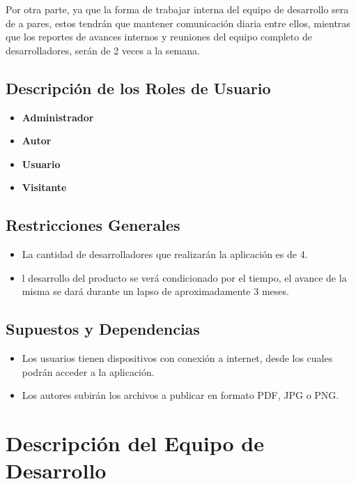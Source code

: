 \documentclass[a4paper,12 pt]{article}
\begin{document}
Por otra parte, ya que la forma de trabajar interna del equipo de desarrollo sera de a pares, estos tendrán que mantener comunicación diaria entre ellos, mientras que los reportes de avances internos y  reuniones del equipo completo de desarrolladores, serán de 2 veces a la semana.

\subsection{Descripción de los Roles de Usuario}

\begin{itemize}
    \item \textbf{Administrador} 
    \item \textbf{Autor} 
    \item \textbf{Usuario} 
    \item \textbf{Visitante} 
\end{itemize}{}

\subsection{Restricciones Generales}

\begin{itemize}
    \item La cantidad de desarrolladores que realizarán la aplicación es de 4.
    \item l desarrollo del producto se verá condicionado por el tiempo, el 
    avance de la misma se dará durante un lapso de aproximadamente 3 meses.
\end{itemize}{}

\subsection{Supuestos y Dependencias}
\begin{itemize}
    \item Los usuarios tienen dispositivos con conexión a internet, desde los
    cuales podrán acceder a la aplicación.
    \item Los autores subirán los archivos a publicar en formato PDF, JPG o PNG.
\end{itemize}{}

\section{Descripción del Equipo de Desarrollo}
\end{document}
